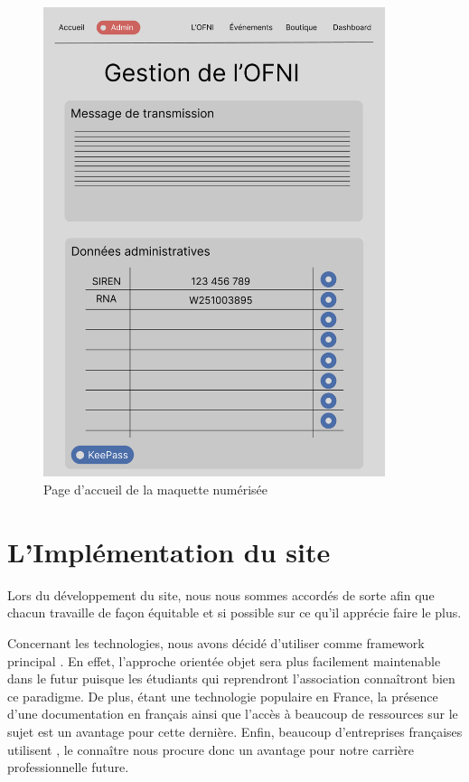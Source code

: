 \begin{figure}[H]
    \centering
    \includegraphics[width=10cm]{assets/pictures/figma.png}
    \caption{Page d'accueil de la maquette numérisée}
    \label{figma}
\end{figure}



\section{L'Implémentation du site}

Lors du développement du site, nous nous sommes accordés de sorte afin que chacun travaille de façon équitable et si possible sur ce qu'il apprécie faire le plus.
\bigskip

Concernant les technologies, nous avons décidé d'utiliser comme framework principal . En effet, l'approche orientée objet sera plus facilement maintenable dans le futur puisque les étudiants qui reprendront l'association connaîtront bien ce paradigme. De plus, étant une technologie populaire en France, la présence d'une documentation en français ainsi que l'accès à beaucoup de ressources sur le sujet est un avantage pour cette dernière. Enfin, beaucoup d'entreprises françaises utilisent , le connaître nous procure donc un avantage pour notre carrière professionnelle future.
\bigskip

